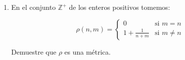 \documentclass[12pt]{article}
\newcommand\Z{\ensuremath{\mathbb{Z}}}
\begin{document}
\begin{enumerate}[label=\textbf{\arabic*}.]
\begin{proof}
    Por la propiedad (a) s.t.q. $d(x,x)=0$

    Por la desigualdad triangular de la hipótesis s.t.q.
    \begin{equation*}
        d(x, x) \geqslant d(x, y) + d(y, x) =  0 \geqslant 2 \cdot d(y, x) = 0 \geqslant d(x,y)
    \end{equation*}
    
    Como $d : X \times X \to  [0, \infty] \Rightarrow  d(x,y) = 0$. Pero por (a) $d(x,y) = 0 \Leftrightarrow x = y \Rightarrow \Leftarrow$ 

    Pero esto es una contradicción, ya que supusimos a $x \neq y  \therefore X$ tiene únicamente un punto
\end{proof}

\item En el conjunto $\Z^+$ de los enteros positivos tomemos:

\begin{equation*}
        \rho(n,m) = 
     \begin{cases}
              0 & \text{si } m = n\\
              1+\frac{1}{n+m} & \text{si } m \neq n
     \end{cases}
    \end{equation*}

Demuestre que $\rho$ es una métrica.


\end{enumerate}
\end{document}

